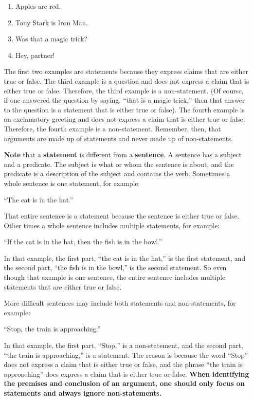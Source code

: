 \documentclass[
]{book}
\begin{document}
\begin{enumerate}
\def\labelenumi{\arabic{enumi}.}
\item
  Apples are red.
\item
  Tony Stark is Iron Man.
\item
  Was that a magic trick?
\item
  Hey, partner!
\end{enumerate}

The first two examples are statements because they express claims that are either true or false. The third example is a question and does not express a claim that is either true or false. Therefore, the third example is a non-statement. (Of course, if one answered the question by saying, ``that is a magic trick,'' then that answer to the question is a statement that is either true or false). The fourth example is an exclamatory greeting and does not express a claim that is either true or false. Therefore, the fourth example is a non-statement. Remember, then, that arguments are made up of statements and never made up of non-statements.

\begin{caution}
\textbf{Note} that a \textbf{statement} is different from a \textbf{sentence}. A sentence has a subject and a predicate. The subject is what or whom the sentence is about, and the predicate is a description of the subject and contains the verb. Sometimes a whole sentence is one statement, for example:

``The cat is in the hat.''
\end{caution}

That entire sentence is a statement because the sentence is either true or false. Other times a whole sentence includes multiple statements, for example:

``If the cat is in the hat, then the fish is in the bowl.''

In that example, the first part, ``the cat is in the hat,'' is the first statement, and the second part, ``the fish is in the bowl,'' is the second statement. So even though that example is one sentence, the entire sentence includes multiple statements that are either true or false.

More difficult sentences may include both statements and non-statements, for example:

``Stop, the train is approaching.''

In that example, the first part, ``Stop,'' is a non-statement, and the second part, ``the train is approaching,'' is a statement. The reason is because the word ``Stop'' does not express a claim that is either true or false, and the phrase ``the train is approaching'' does express a claim that is either true or false. \textbf{When identifying the premises and conclusion of an argument, one should only focus on statements and always ignore non-statements.}
\end{document}
